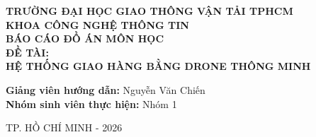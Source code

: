 ﻿\documentclass[12pt,a4paper]{report}
\begin{document}
\begin{titlepage}
    \centering
    \vspace*{1cm}
    \Large\textbf{TRƯỜNG ĐẠI HỌC GIAO THÔNG VẬN TẢI TPHCM}\\[0.5cm]
    \textbf{KHOA CÔNG NGHỆ THÔNG TIN}\\[2cm]
    
    \Large\textbf{BÁO CÁO ĐỒ ÁN MÔN HỌC}\\[0.5cm]
    \Large\textbf{ĐỀ TÀI:}\\
    \huge\textbf{HỆ THỐNG GIAO HÀNG BẰNG DRONE THÔNG MINH}\\[2cm]
    
    \Large
    \begin{flushright}
        \textbf{Giảng viên hướng dẫn:} Nguyễn Văn Chiến \\
        \textbf{Nhóm sinh viên thực hiện:} Nhóm 1\\
    \end{flushright}
    
    \vfill
    \Large TP. HỒ CHÍ MINH - 2026
\end{titlepage}

\tableofcontents
\clearpage






\end{document}
